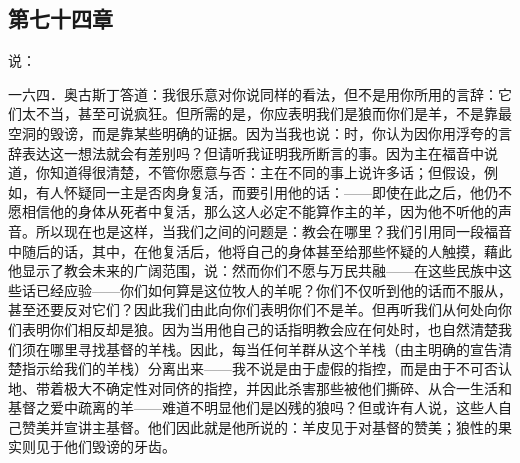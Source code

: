 
\subsection{第七十四章}

 说：\par

一六四．奥古斯丁答道：我很乐意对你说同样的看法，但不是用你所用的言辞：它们太不当，甚至可说疯狂。但所需的是，你应表明我们是狼而你们是羊，不是靠最空洞的毁谤，而是靠某些明确的证据。因为当我也说：时，你认为因你用浮夸的言辞表达这一想法就会有差别吗？但请听我证明我所断言的事。因为主在福音中说道，你知道得很清楚，不管你愿意与否：主在不同的事上说许多话；但假设，例如，有人怀疑同一主是否肉身复活，而要引用他的话：——即使在此之后，他仍不愿相信他的身体从死者中复活，那么这人必定不能算作主的羊，因为他不听他的声音。所以现在也是这样，当我们之间的问题是：教会在哪里？我们引用同一段福音中随后的话，其中，在他复活后，他将自己的身体甚至给那些怀疑的人触摸，藉此他显示了教会未来的广阔范围，说：然而你们不愿与万民共融——在这些民族中这些话已经应验——你们如何算是这位牧人的羊呢？你们不仅听到他的话而不服从，甚至还要反对它们？因此我们由此向你们表明你们不是羊。但再听我们从何处向你们表明你们相反却是狼。因为当用他自己的话指明教会应在何处时，也自然清楚我们须在哪里寻找基督的羊栈。因此，每当任何羊群从这个羊栈（由主明确的宣告清楚指示给我们的羊栈）分离出来——我不说是由于虚假的指控，而是由于不可否认地、带着极大不确定性对同侪的指控，并因此杀害那些被他们撕碎、从合一生活和基督之爱中疏离的羊——难道不明显他们是凶残的狼吗？但或许有人说，这些人自己赞美并宣讲主基督。他们因此就是他所说的：羊皮见于对基督的赞美；狼性的果实则见于他们毁谤的牙齿。\par


